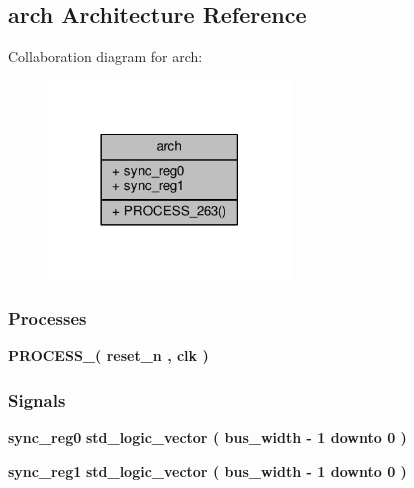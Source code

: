 \subsection{arch Architecture Reference}
\label{classbus__sync__reg_1_1arch}


Collaboration diagram for arch\+:\nopagebreak
\begin{figure}[H]
\begin{center}
\leavevmode
\includegraphics[width=182pt]{d3/d6f/classbus__sync__reg_1_1arch__coll__graph}
\end{center}
\end{figure}
\subsubsection*{Processes}
 \begin{DoxyCompactItemize}
\item 
{\bf P\+R\+O\+C\+E\+S\+S\+\_}{\bfseries  ( {\bfseries {\bfseries {\bf reset\+\_\+n}} \textcolor{vhdlchar}{ }} , {\bfseries {\bfseries {\bf clk}} \textcolor{vhdlchar}{ }} )}
\end{DoxyCompactItemize}
\subsubsection*{Signals}
 \begin{DoxyCompactItemize}
\item 
{\bf sync\+\_\+reg0} {\bfseries \textcolor{comment}{std\+\_\+logic\+\_\+vector}\textcolor{vhdlchar}{ }\textcolor{vhdlchar}{(}\textcolor{vhdlchar}{ }\textcolor{vhdlchar}{ }\textcolor{vhdlchar}{ }\textcolor{vhdlchar}{ }{\bfseries {\bf bus\+\_\+width}} \textcolor{vhdlchar}{-\/}\textcolor{vhdlchar}{ } \textcolor{vhdldigit}{1} \textcolor{vhdlchar}{ }\textcolor{keywordflow}{downto}\textcolor{vhdlchar}{ }\textcolor{vhdlchar}{ } \textcolor{vhdldigit}{0} \textcolor{vhdlchar}{ }\textcolor{vhdlchar}{)}\textcolor{vhdlchar}{ }} 
\item 
{\bf sync\+\_\+reg1} {\bfseries \textcolor{comment}{std\+\_\+logic\+\_\+vector}\textcolor{vhdlchar}{ }\textcolor{vhdlchar}{(}\textcolor{vhdlchar}{ }\textcolor{vhdlchar}{ }\textcolor{vhdlchar}{ }\textcolor{vhdlchar}{ }{\bfseries {\bf bus\+\_\+width}} \textcolor{vhdlchar}{-\/}\textcolor{vhdlchar}{ } \textcolor{vhdldigit}{1} \textcolor{vhdlchar}{ }\textcolor{keywordflow}{downto}\textcolor{vhdlchar}{ }\textcolor{vhdlchar}{ } \textcolor{vhdldigit}{0} \textcolor{vhdlchar}{ }\textcolor{vhdlchar}{)}\textcolor{vhdlchar}{ }} 
\end{DoxyCompactItemize}


